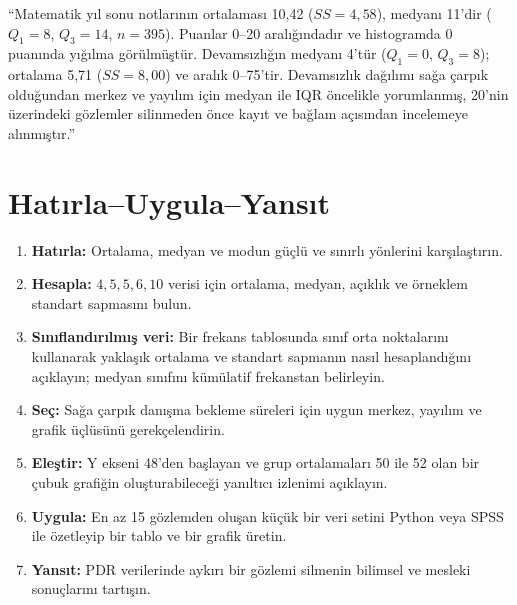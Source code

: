 ``Matematik yıl sonu notlarının ortalaması 10,42 ($SS=4{,}58$), medyanı
11'dir ($Q_1=8$, $Q_3=14$, $n=395$). Puanlar 0--20 aralığındadır ve
histogramda 0 puanında yığılma görülmüştür. Devamsızlığın medyanı 4'tür
($Q_1=0$, $Q_3=8$); ortalama 5,71 ($SS=8{,}00$) ve aralık 0--75'tir.
Devamsızlık dağılımı sağa çarpık olduğundan merkez ve yayılım için medyan ile
IQR öncelikle yorumlanmış, 20'nin üzerindeki gözlemler silinmeden önce kayıt
ve bağlam açısından incelemeye alınmıştır.''





\section*{Hatırla--Uygula--Yansıt}

\begin{enumerate}
\renewcommand{\labelenumi}{\textbf{\Alph{enumi}.}}
  \item \textbf{Hatırla:} Ortalama, medyan ve modun güçlü ve sınırlı yönlerini karşılaştırın.
  \item \textbf{Hesapla:} $4,5,5,6,10$ verisi için ortalama, medyan, açıklık ve örneklem standart sapmasını bulun.
  \item \textbf{Sınıflandırılmış veri:} Bir frekans tablosunda sınıf orta noktalarını kullanarak yaklaşık ortalama ve standart sapmanın nasıl hesaplandığını açıklayın; medyan sınıfını kümülatif frekanstan belirleyin.
  \item \textbf{Seç:} Sağa çarpık danışma bekleme süreleri için uygun merkez, yayılım ve grafik üçlüsünü gerekçelendirin.
  \item \textbf{Eleştir:} Y ekseni 48'den başlayan ve grup ortalamaları 50 ile 52 olan bir çubuk grafiğin oluşturabileceği yanıltıcı izlenimi açıklayın.
  \item \textbf{Uygula:} En az 15 gözlemden oluşan küçük bir veri setini Python veya SPSS ile özetleyip bir tablo ve bir grafik üretin.
  \item \textbf{Yansıt:} PDR verilerinde aykırı bir gözlemi silmenin bilimsel ve mesleki sonuçlarını tartışın.
\end{enumerate}


